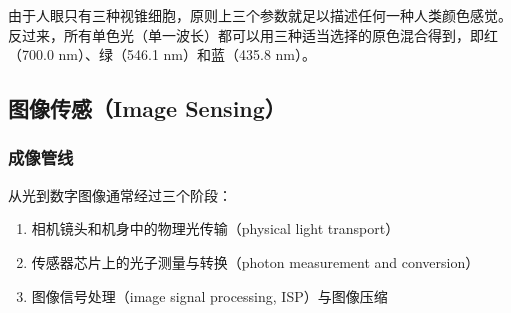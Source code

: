 \documentclass{ctexart}
\begin{document}
由于人眼只有三种视锥细胞，原则上三个参数就足以描述任何一种人类颜色感觉。反过来，所有单色光（单一波长）都可以用三种适当选择的原色混合得到，即红（700.0 nm）、绿（546.1 nm）和蓝（435.8 nm）。

\subsection{图像传感（Image Sensing）}

\subsubsection{成像管线}

从光到数字图像通常经过三个阶段：

\begin{enumerate}
    \item 相机镜头和机身中的物理光传输（physical light transport）
    \item 传感器芯片上的光子测量与转换（photon measurement and conversion）
    \item 图像信号处理（image signal processing, ISP）与图像压缩
\end{enumerate}
\end{document}
